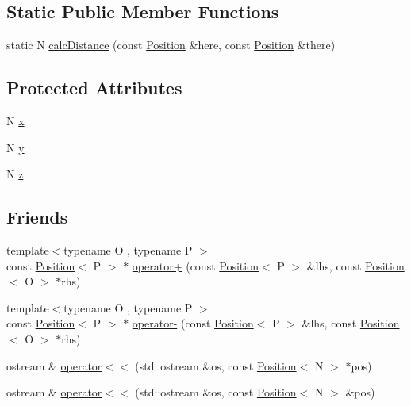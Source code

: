 \subsection*{Static Public Member Functions}
\begin{DoxyCompactItemize}
\item 
static N \hyperlink{struct_position_acbec1420f0dc8f505c745b399ae93234}{calc\-Distance} (const \hyperlink{struct_position}{Position} \&here, const \hyperlink{struct_position}{Position} \&there)
\end{DoxyCompactItemize}
\subsection*{Protected Attributes}
\begin{DoxyCompactItemize}
\item 
N \hyperlink{struct_position_af908be922fc88d89d81be7d08d06f761}{x}
\item 
N \hyperlink{struct_position_af434f54a0aad8bbfc3806ebdd197aa3b}{y}
\item 
N \hyperlink{struct_position_ac430da98504c2d4fd685c0363d728474}{z}
\end{DoxyCompactItemize}
\subsection*{Friends}
\begin{DoxyCompactItemize}
\item 
{\footnotesize template$<$typename O , typename P $>$ }\\const \hyperlink{struct_position}{Position}$<$ P $>$ $\ast$ \hyperlink{struct_position_aa839563739359a38d864a2d4a4e616e3}{operator+} (const \hyperlink{struct_position}{Position}$<$ P $>$ \&lhs, const \hyperlink{struct_position}{Position}$<$ O $>$ $\ast$rhs)
\item 
{\footnotesize template$<$typename O , typename P $>$ }\\const \hyperlink{struct_position}{Position}$<$ P $>$ $\ast$ \hyperlink{struct_position_a952651ce7dae93907c21bf178d58dd94}{operator-\/} (const \hyperlink{struct_position}{Position}$<$ P $>$ \&lhs, const \hyperlink{struct_position}{Position}$<$ O $>$ $\ast$rhs)
\item 
ostream \& \hyperlink{struct_position_a7adf840eaa5364c5fdddbc148fcbbdee}{operator$<$$<$} (std\-::ostream \&os, const \hyperlink{struct_position}{Position}$<$ N $>$ $\ast$pos)
\item 
ostream \& \hyperlink{struct_position_a8d4dbe2f6bca09c4129d69b47bc4b2ac}{operator$<$$<$} (std\-::ostream \&os, const \hyperlink{struct_position}{Position}$<$ N $>$ \&pos)
\end{DoxyCompactItemize}


